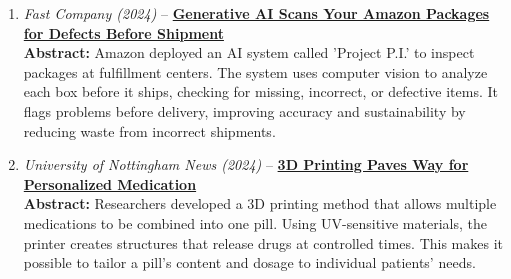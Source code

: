\documentclass[12pt]{article}
\begin{document}
\begin{enumerate}[label=\arabic*.]
 \item \textit{Fast Company (2024)} -- \href{https://technews.acm.org/archives.cfm?fo=2024-06-jun#21}{\textbf{Generative AI Scans Your Amazon Packages for Defects Before Shipment}}\\
\footnotesize\textbf{Abstract:} Amazon deployed an AI system called 'Project P.I.' to inspect packages at fulfillment centers. The system uses computer vision to analyze each box before it ships, checking for missing, incorrect, or defective items. It flags problems before delivery, improving accuracy and sustainability by reducing waste from incorrect shipments.\\

 \item \textit{University of Nottingham News (2024)} -- \href{https://technews.acm.org/archives.cfm?fo=2024-05-may#17}{\textbf{3D Printing Paves Way for Personalized Medication}}\\
\footnotesize\textbf{Abstract:} Researchers developed a 3D printing method that allows multiple medications to be combined into one pill. Using UV-sensitive materials, the printer creates structures that release drugs at controlled times. This makes it possible to tailor a pill's content and dosage to individual patients’ needs.\\

\end{enumerate}
\end{document}
